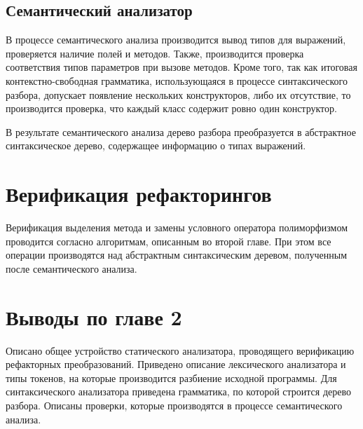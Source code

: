 \subsection{Семантический анализатор}
В процессе семантического анализа производится вывод типов для выражений, проверяется наличие полей и методов.
Также, производится проверка соответствия типов параметров при вызове методов.
Кроме того, так как итоговая контекстно-свободная грамматика, использующаяся в процессе синтаксического разбора,
допускает появление нескольких конструкторов, либо их отсутствие, то производится проверка,
что каждый класс содержит ровно один конструктор.

В результате семантического анализа дерево разбора преобразуется в абстрактное синтаксическое дерево,
содержащее информацию о типах выражений.
\section{Верификация рефакторингов}
Верификация выделения метода и замены условного оператора полиморфизмом проводится согласно алгоритмам, описанным во второй главе.
При этом все операции производятся над абстрактным синтаксическим деревом, полученным после семантического анализа.
\section*{Выводы по главе 2}
Описано общее устройство статического анализатора, проводящего верификацию рефакторных преобразований.
Приведено описание лексического анализатора и типы токенов, на которые производится разбиение исходной программы.
Для синтаксического анализатора приведена грамматика, по которой строится дерево разбора.
Описаны проверки, которые производятся в процессе семантического анализа.